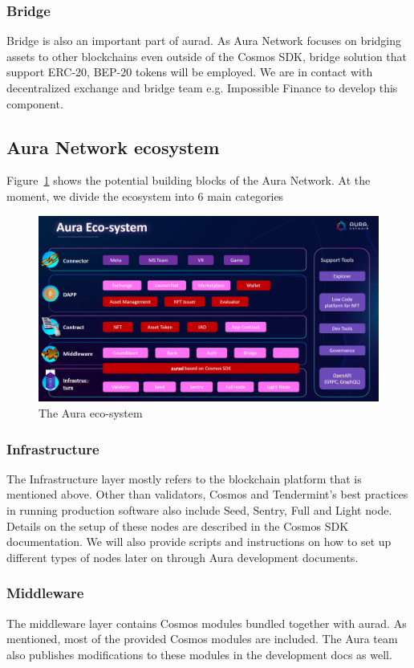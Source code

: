 \documentclass[11pt, titlepage]{article}
\begin{document}
\subsubsection*{Bridge}
Bridge is also an important part of aurad. As Aura Network focuses on bridging assets to other blockchains even outside of the Cosmos SDK, bridge solution that support ERC-20, BEP-20 tokens will be employed. We are in contact with decentralized exchange and bridge team e.g. Impossible Finance to develop this component. 

\subsection{Aura Network ecosystem}
Figure~\ref{fig:auraeco} shows the potential building blocks of the Aura Network. At the moment, we divide the ecosystem into 6 main categories

\begin{figure}[ht]
\label{fig:auraeco}
\includegraphics[width=14cm]{img/auraeco.png}
\centering
\caption{The Aura eco-system}
\end{figure}

\subsubsection*{Infrastructure}
The Infrastructure layer mostly refers to the blockchain platform that is mentioned above. Other than validators, Cosmos and Tendermint's best practices in running production software also include Seed, Sentry, Full and Light node. Details on the setup of these nodes are described in the Cosmos SDK documentation. We will also provide scripts and instructions on how to set up different types of nodes later on through Aura development documents.

\subsubsection*{Middleware}
The middleware layer contains Cosmos modules bundled together with aurad. As mentioned, most of the provided Cosmos modules are included. The Aura team also publishes modifications to these modules in the development docs as well.
\end{document}
